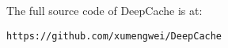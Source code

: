 \documentclass[10pt,acmtog]{acmart}
\newcommand{\framework}{DeepCache\xspace}
\newcommand{\revise}[1]{{#1}}
\begin{document}
\revise{
The full source code of \framework is at:
\begin{center}
\texttt{https://github.com/xumengwei/DeepCache}
\end{center}
}%
\end{document}
